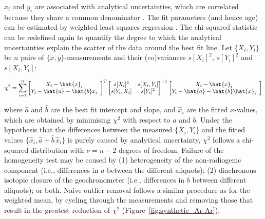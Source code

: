 \documentclass[gchron, manuscript]{copernicus}
\begin{document}
$x_i$ and $y_i$ are associated with analytical uncertainties, which
are correlated because they share a common denominator
\citep{pearson1896, chayes1949}. The fit parameters (and hence age)
can be estimated by weighted least squares regression
\citep{york2004}. The chi-squared statistic can be redefined again to
quantify the degree to which the analytical uncertainties explain the
scatter of the data around the best fit line. Let $\{X_i,Y_i\}$ be $n$
pairs of $\{x,y\}$-measurements and their (co)variances $s[X_i]^2$,
$s[Y_i]^2$ and $s[X_i,Y_i]$:

\begin{equation}
  \chi^2 = \sum\limits_{i=1}^{n}
  \left[
    \begin{array}{@{}cc@{}}
      X_i - \hat{x}_i \\
      Y_i - \hat{a} - \hat{b} x_i
    \end{array}
    \right]^T
  \left[
    \begin{array}{@{}cc@{}}
      s[X_i]^2 & s[X_i,Y_i] \\
      s[Y_i,X_i] & s[Y_i]^2
    \end{array}
    \right]^{-1}
  \left[
    \begin{array}{@{}cc@{}}
      X_i - \hat{x}_i\\
      Y_i - \hat{a} - \hat{b} \hat{x}_i
    \end{array}
    \right]
\end{equation}
  
\noindent where $\hat{a}$ and $\hat{b}$ are the best fit intercept and
slope, and $\hat{x}_i$ are the fitted $x$-values, which are obtained
by minimising $\chi^2$ with respect to $a$ and $b$. Under the
hypothesis that the differences between the measured $\{X_i,Y_i\}$ and
the fitted values $\{\hat{x}_i,\hat{a}+\hat{b}\,\hat{x}_i\}$ is purely
caused by analytical uncertainty, $\chi^2$ follows a chi-squared
distribution with $\nu = n-2$ degrees of freedom. Failure of the
homogeneity test may be caused by (1) heterogeneity of the
non-radiogenic component (i.e., differences in $a$ between the
different aliquots); (2) diachronous isotopic closure of the
geochronometer (i.e., differences in $b$ between different aliquots);
or both. Naive outlier removal follows a similar procedure as for the
weighted mean, by cycling through the measurements and removing those
that result in the greatest reduction of $\chi^2$
(Figure~\ref{fig:synthetic_Ar-Ar}).\medskip
\end{document}
